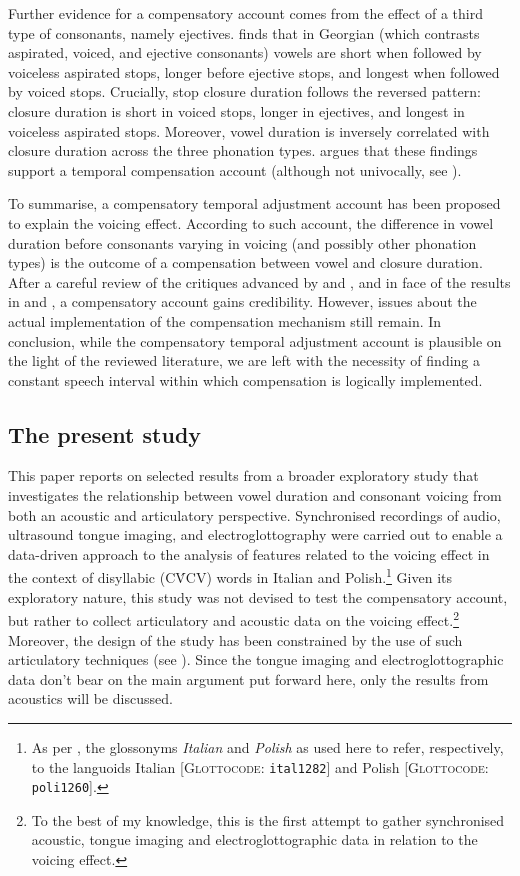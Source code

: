 \documentclass[preprint]{JASAnew}
\begin{document}
Further evidence for a compensatory account comes from the effect of a
third type of consonants, namely ejectives. \citet{begus2017} finds that
in Georgian (which contrasts aspirated, voiced, and ejective consonants)
vowels are short when followed by voiceless aspirated stops, longer
before ejective stops, and longest when followed by voiced stops.
Crucially, stop closure duration follows the reversed pattern: closure
duration is short in voiced stops, longer in ejectives, and longest in
voiceless aspirated stops. Moreover, vowel duration is inversely
correlated with closure duration across the three phonation types.
\citet{begus2017} argues that these findings support a temporal
compensation account (although not univocally, see
\citealt[Section V]{begus2017}).

To summarise, a compensatory temporal adjustment account has been
proposed to explain the voicing effect. According to such account, the
difference in vowel duration before consonants varying in voicing (and
possibly other phonation types) is the outcome of a compensation between
vowel and closure duration. After a careful review of the critiques
advanced by \citet{chen1970} and \citet{maddieson1976}, and in face of
the results in \citet{slis1969} and \citet{begus2017}, a compensatory
account gains credibility. However, issues about the actual
implementation of the compensation mechanism still remain. In
conclusion, while the compensatory temporal adjustment account is
plausible on the light of the reviewed literature, we are left with the
necessity of finding a constant speech interval within which
compensation is logically implemented.

\subsection{The present study}\label{the-present-study}

This paper reports on selected results from a broader exploratory study
that investigates the relationship between vowel duration and consonant
voicing from both an acoustic and articulatory perspective. Synchronised
recordings of audio, ultrasound tongue imaging, and electroglottography
were carried out to enable a data-driven approach to the analysis of
features related to the voicing effect in the context of disyllabic
(CV́CV) words in Italian and
Polish.\footnote{As per \citet{cysouw2013}, the glossonyms \textit{Italian} and \textit{Polish} as used here to refer, respectively, to the languoids Italian [\textsc{Glottocode}: \texttt{ital1282}] and Polish [\textsc{Glottocode}: \texttt{poli1260}].}
Given its exploratory nature, this study was not devised to test the
compensatory account, but rather to collect articulatory and acoustic
data on the voicing
effect.\footnote{To the best of my knowledge, this is the first attempt to gather synchronised acoustic, tongue imaging and electroglottographic data in relation to the voicing effect.}
Moreover, the design of the study has been constrained by the use of
such articulatory techniques (see ). Since the tongue
imaging and electroglottographic data don't bear on the main argument
put forward here, only the results from acoustics will be discussed.
\end{document}
